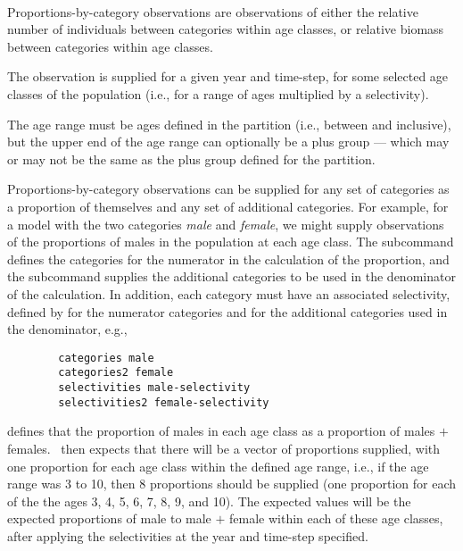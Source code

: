 {{{{\paragraph*{\label{sec:proportions-by-category}}
Proportions-by-category observations are observations of either the relative number of individuals between categories within age classes, or relative biomass between categories within age classes. 

The observation is supplied for a given year and time-step, for some selected age classes of the population (i.e., for a range of ages multiplied by a selectivity).

The age range must be ages defined in the partition (i.e., between  and  inclusive), but the upper end of the age range can optionally be a plus group --- which may or may not be the same as the plus group defined for the partition. 

Proportions-by-category observations can be supplied for any set of categories as a proportion of themselves and any set of additional categories. For example, for a model with the two categories \emph{male} and \emph{female}, we might supply observations of the proportions of males in the population at each age class. The subcommand  defines the categories for the numerator in the calculation of the proportion, and the subcommand  supplies the additional categories to be used in the denominator of the calculation. In addition, each category must have an associated selectivity, defined by  for the numerator categories and  for the additional categories used in the denominator, e.g., 

{\small{\begin{verbatim}
		categories male
		categories2 female
		selectivities male-selectivity
		selectivities2 female-selectivity
		\end{verbatim}}}

defines that the proportion of males in each age class as a proportion of males $+$ females. \CNAME\ then expects that there will be a vector of proportions supplied, with one proportion for each age class within the defined age range, i.e., if the age range was 3 to 10, then 8 proportions should be supplied (one proportion for each of the the ages 3, 4, 5, 6, 7, 8, 9, and 10). The expected values will be the expected proportions of male to male $+$ female within each of these age classes, after applying the selectivities at the year and time-step specified. 

}}}}
